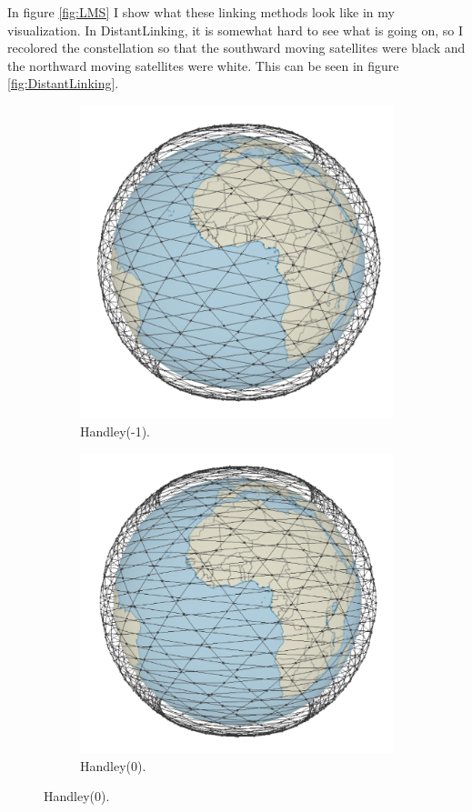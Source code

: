 \documentclass[12pt,a4paper,twoside,openright]{report}
\begin{document}
In figure \ref{fig:LMS} I show what these linking methods look like in my visualization. In DistantLinking, it is somewhat hard to see what is going on, so I recolored the constellation so that the southward moving satellites were black and the northward moving satellites were white. This can be seen in figure \ref{fig:DistantLinking}.

\begin{figure}
	\centering
	\caption{Images of the three linking methods that I examined}
	\label{fig:LMS}
	\begin{subfigure}[b]{0.3\textwidth}
		\caption{Handley(-1).}
		\includegraphics[width=\textwidth]{Handley-1}
	\end{subfigure}
	\hfill
	\begin{subfigure}[b]{0.3\textwidth}
		\caption{Handley(0).}
		\includegraphics[width=\textwidth]{Handley0}

\end{subfigure}
\end{figure}
\end{document}
